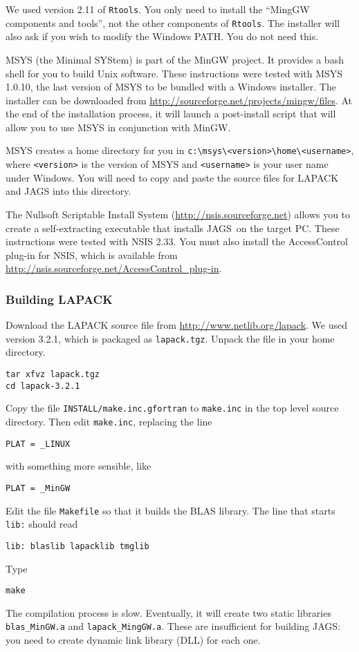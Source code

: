 \documentclass[11pt, a4paper, titlepage]{article}
\newcommand{\JAGS}{\textsf{JAGS}}
\begin{document}
We used version 2.11 of \verb+Rtools+.  You only need to install the
``MingGW components and tools'', not the other components of
\verb+Rtools+. The installer will also ask if you wish to modify the
Windows PATH. You do not need this.

MSYS (the Minimal SYStem) is part of the MinGW project. It provides a
bash shell for you to build Unix software. These instructions were
tested with MSYS 1.0.10, the last version of MSYS to be bundled with a
Windows installer.  The installer can be downloaded from
\url{http://sourceforge.net/projects/mingw/files}.  At the end of the
installation process, it will launch a post-install script that will
allow you to use MSYS in conjunction with MinGW.

MSYS creates a home directory for you in
\verb+c:\msys\<version>\home\<username>+, where \texttt{<version>} is
the version of MSYS and \texttt{<username>} is your user name under
Windows. You will need to copy and paste the source files for LAPACK
and JAGS into this directory.

The Nullsoft Scriptable Install System
(\url{http://nsis.sourceforge.net}) allows you to create a
self-extracting executable that installs \JAGS\ on the target PC.
These instructions were tested with NSIS 2.33.  You must also install
the AccessControl plug-in for NSIS, which is available from
\url{http://nsis.sourceforge.net/AccessControl_plug-in}.

\subsubsection{Building LAPACK}

Download the LAPACK source file from
\url{http://www.netlib.org/lapack}. We used version 3.2.1, which is
packaged as \verb+lapack.tgz+. Unpack the file in your home directory.
\begin{verbatim}
tar xfvz lapack.tgz
cd lapack-3.2.1
\end{verbatim}
Copy the file \texttt{INSTALL/make.inc.gfortran} to \texttt{make.inc} in
the top level source directory.  Then edit \texttt{make.inc},
replacing the line
\begin{verbatim}
PLAT = _LINUX
\end{verbatim}
with something more sensible, like
\begin{verbatim}
PLAT = _MinGW
\end{verbatim} 

Edit the file \texttt{Makefile} so that it builds the BLAS library. The
line that starts \texttt{lib:} should read
\begin{verbatim}
lib: blaslib lapacklib tmglib
\end{verbatim}
Type
\begin{verbatim}
make 
\end{verbatim}
The compilation process is slow. Eventually, it will create two static
libraries \verb+blas_MinGW.a+ and \verb+lapack_MingGW.a+. These are
insufficient for building \JAGS: you need to create dynamic link
library (DLL) for each one.
\end{document}
